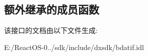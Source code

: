\subsection*{额外继承的成员函数}


该接口的文档由以下文件生成\+:\begin{DoxyCompactItemize}
\item 
E\+:/\+React\+O\+S-\/0../sdk/include/dxsdk/bdatif.\+idl\end{DoxyCompactItemize}
